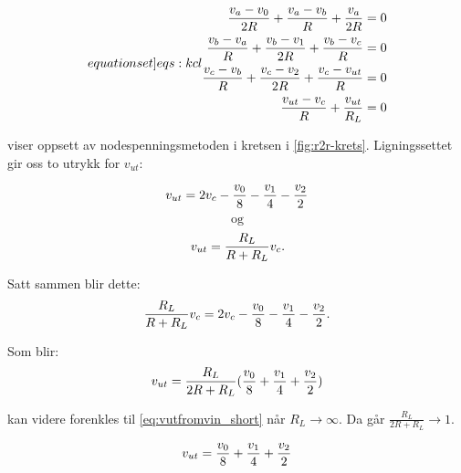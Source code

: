 \documentclass[11pt,a4paper,twocolumn]{article}
\begin{document}
\begin{subequations}
\label[equationset]{eqs:kcl}

\begin{align}
\frac{v_a-v_0}{2R}+\frac{v_a-v_b}{R}+\frac{v_a}{2R} = 0 \label{eqs:kcl:1} \\
\frac{v_b-v_a}{R} + \frac{v_b-v_1}{2R}+\frac{v_b-v_c}{R} = 0 \label{eqs:kcl:2} \\
\frac{v_c-v_b}{R} + \frac{v_c-v_2}{2R} + \frac{v_c-v_{ut}}{R} = 0 \label{eqs:kcl:3} \\
\frac{v_{ut}-v_c}{R} + \frac{v_{ut}}{R_L} = 0 \label{eqs:kcl:4}
\end{align}
\end{subequations}

 viser oppsett av nodespenningsmetoden i kretsen i \cref{fig:r2r-krets}. Ligningssettet gir oss to utrykk for $v_{ut}$:

\begin{equation}
\label{eq:derivedfrom3}
v_{ut} = 2v_c - \frac{v_0}{8} - \frac{v_1}{4} - \frac{v_2}{2} \\
\end{equation}
$$\text{og}$$
\begin{equation}
\label{eq:derivedfrom4}
v_{ut} = \frac{R_L}{R + R_L}v_c.\\
\end{equation}

Satt sammen blir dette:
\[
\frac{R_L}{R + R_L}v_c = 2v_c - \frac{v_0}{8} - \frac{v_1}{4} - \frac{v_2}{2}\\.
\]

Som blir:
\begin{equation}
v_{ut} = \frac{R_L}{2R + R_L}(\frac{v_0}{8} + \frac{v_1}{4} + \frac{v_2}{2})\\
\label{eq:vutfromvin_full}
\end{equation}

 kan videre forenkles til \cref{eq:vutfromvin_short} når $R_L \to \infty$. Da går $\frac{R_L}{2R + R_L} \to 1$.

\begin{equation}
v_{ut} = \frac{v_0}{8} + \frac{v_1}{4} + \frac{v_2}{2}\\
\label{eq:vutfromvin_short}
\end{equation}
\end{document}
